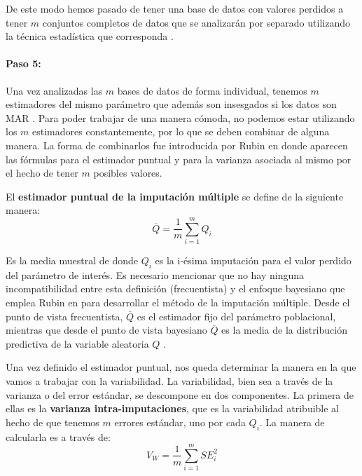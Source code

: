\documentclass[a4paper,openright,12pt]{report}
\begin{document}
De este modo hemos pasado de tener una base de datos con valores perdidos a tener $m$ conjuntos completos de datos que se analizarán por separado utilizando la técnica estadística que corresponda \cite{Rubin1978_3}.

\paragraph{Paso 5:}

Una vez analizadas las $m$ bases de datos de forma individual, tenemos $m$ estimadores del mismo parámetro que además son insesgados si los datos son MAR \cite{VanBuuren2012}. Para poder trabajar de una manera cómoda, no podemos estar utilizando los $m$ estimadores constantemente, por lo que se deben combinar de alguna manera. La forma de combinarlos fue introducida por Rubin en \cite{Rubin1987} donde aparecen las fórmulas para el estimador puntual y para la varianza asociada al mismo por el hecho de tener $m$ posibles valores. 

El \textbf{estimador puntual de la imputación múltiple} se define de la siguiente manera:
\begin{equation}
\overline{Q}=\frac{1}{m}\sum_{i=1}^{m}Q_{i}
\label{estimador_puntual_imputacion multiple}
\end{equation}

Es la media muestral de donde $Q_{i}$ es la i-ésima imputación para el valor perdido del parámetro de interés. Es necesario mencionar que no hay ninguna incompatibilidad entre esta definición (frecuentista) y el enfoque bayesiano que emplea Rubin en \cite{Rubin1987} para desarrollar el método de la imputación múltiple. Desde el punto de vista frecuentista, $\overline{Q}$ es el estimador fijo del parámetro poblacional, mientras que desde el punto de vista bayesiano $\overline{Q}$ es la media de la distribución predictiva de la variable aleatoria $Q$  \cite{VanBuuren2012}.

Una vez definido el estimador puntual, nos queda determinar la manera en la que vamos a trabajar con la variabilidad. La variabilidad, bien sea a través de la varianza o del error estándar, se descompone en dos componentes. La primera de ellas es la \textbf{varianza intra-imputaciones}, que es la variabilidad atribuible al hecho de que tenemos $m$ errores estándar, uno por cada $Q_{i}$. La manera de calcularla es a través de:
\begin{equation}
V_{W}=\frac{1}{m}\sum_{i=1}^{m}SE_{i}^{2}
\label{within_var_est_puntual}
\end{equation}
\end{document}
